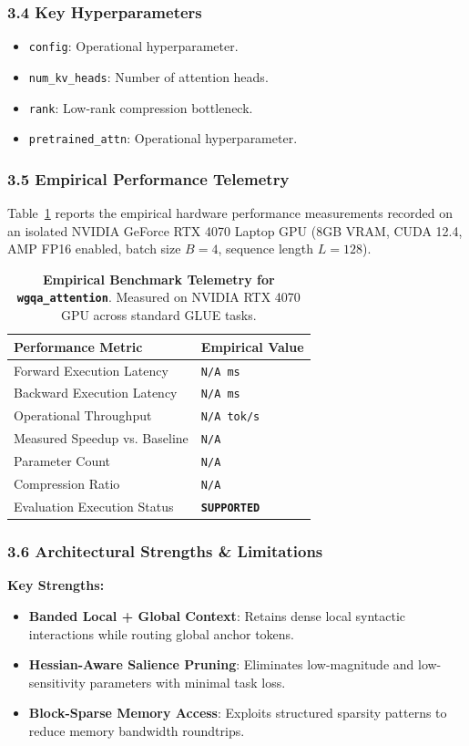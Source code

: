 \subsubsection*{3.4 Key Hyperparameters}
\begin{itemize}
    \item \texttt{config}: Operational hyperparameter.
    \item \texttt{num\_kv\_heads}: Number of attention heads.
    \item \texttt{rank}: Low-rank compression bottleneck.
    \item \texttt{pretrained\_attn}: Operational hyperparameter.
\end{itemize}

\subsubsection*{3.5 Empirical Performance Telemetry}
Table~\ref{tab:telemetry_wgqa\_attention} reports the empirical hardware performance measurements recorded on an isolated NVIDIA GeForce RTX 4070 Laptop GPU (8GB VRAM, CUDA 12.4, AMP FP16 enabled, batch size $B=4$, sequence length $L=128$).

\begin{table}[h]
\centering
\small
\caption{\textbf{Empirical Benchmark Telemetry for \texttt{wgqa\_attention}}. Measured on NVIDIA RTX 4070 GPU across standard GLUE tasks.}
\label{tab:telemetry_wgqa\_attention}
\begin{tabularx}{\columnwidth}{lX}
\toprule
\textbf{Performance Metric} & \textbf{Empirical Value} \\
\midrule
Forward Execution Latency & \texttt{N/A ms} \\
Backward Execution Latency & \texttt{N/A ms} \\
Operational Throughput & \texttt{N/A tok/s} \\
Measured Speedup vs. Baseline & \texttt{N/A} \\
Parameter Count & \texttt{N/A} \\
Compression Ratio & \texttt{N/A} \\
Evaluation Execution Status & \textbf{\texttt{SUPPORTED}} \\
\bottomrule
\end{tabularx}
\end{table}

\subsubsection*{3.6 Architectural Strengths \& Limitations}
\textbf{Key Strengths:}
\begin{itemize}
    \item \textbf{Banded Local + Global Context}: Retains dense local syntactic interactions while routing global anchor tokens.
    \item \textbf{Hessian-Aware Salience Pruning}: Eliminates low-magnitude and low-sensitivity parameters with minimal task loss.
    \item \textbf{Block-Sparse Memory Access}: Exploits structured sparsity patterns to reduce memory bandwidth roundtrips.
\end{itemize}

